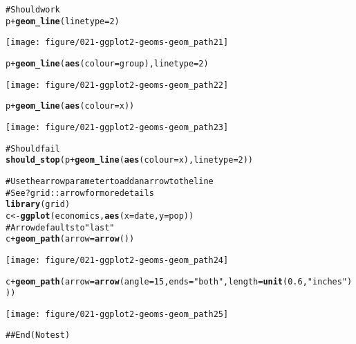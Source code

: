 \documentclass[a4paper,titlepage]{tufte-handout}\usepackage{graphicx, color}
\makeatletter
\def\maxwidth{ %
  \ifdim\Gin@nat@width>\linewidth
    \linewidth
  \else
    \Gin@nat@width
  \fi
}
\newcommand{\hlfunctioncall}[1]{\textcolor[rgb]{0.501960784313725,0,0.329411764705882}{\textbf{#1}}}%
\newcommand{\hlstring}[1]{\textcolor[rgb]{0.6,0.6,1}{#1}}%
\newcommand{\hlcomment}[1]{\textcolor[rgb]{0.180392156862745,0.6,0.341176470588235}{#1}}%
\newenvironment{kframe}{%
 \def\at@end@of@kframe{}%
 \ifinner\ifhmode%
  \def\at@end@of@kframe{\end{minipage}}%
  \begin{minipage}{\columnwidth}%
 \fi\fi%
 \def\FrameCommand##1{\hskip\@totalleftmargin \hskip-\fboxsep
 \colorbox{shadecolor}{##1}\hskip-\fboxsep
     \hskip-\linewidth \hskip-\@totalleftmargin \hskip\columnwidth}%
 \MakeFramed {\advance\hsize-\width
   \@totalleftmargin\z@ \linewidth\hsize
   \@setminipage}}%
 {\par\unskip\endMakeFramed%
 \at@end@of@kframe}
\newenvironment{knitrout}{}{} %
\makeatother
\begin{document}
\begin{knitrout}
\begin{kframe}
\begin{alltt}
\hlcomment{# Should work}
p + \hlfunctioncall{geom_line}(linetype = 2)
\end{alltt}
\end{kframe}
\texttt{[image: figure/021-ggplot2-geoms-geom\_path21]} 
\begin{kframe}\begin{alltt}
p + \hlfunctioncall{geom_line}(\hlfunctioncall{aes}(colour = group), linetype = 2)
\end{alltt}
\end{kframe}
\texttt{[image: figure/021-ggplot2-geoms-geom\_path22]} 
\begin{kframe}\begin{alltt}
p + \hlfunctioncall{geom_line}(\hlfunctioncall{aes}(colour = x))
\end{alltt}
\end{kframe}
\texttt{[image: figure/021-ggplot2-geoms-geom\_path23]} 
\begin{kframe}\begin{alltt}

\hlcomment{# Should fail}
\hlfunctioncall{should_stop}(p + \hlfunctioncall{geom_line}(\hlfunctioncall{aes}(colour = x), linetype=2))

\hlcomment{# Use the arrow parameter to add an arrow to the line}
\hlcomment{# See ?grid::arrow for more details}
\hlfunctioncall{library}(grid)
c <- \hlfunctioncall{ggplot}(economics, \hlfunctioncall{aes}(x = date, y = pop))
\hlcomment{# Arrow defaults to "last"}
c + \hlfunctioncall{geom_path}(arrow = \hlfunctioncall{arrow}())
\end{alltt}
\end{kframe}
\texttt{[image: figure/021-ggplot2-geoms-geom\_path24]} 
\begin{kframe}\begin{alltt}
c + \hlfunctioncall{geom_path}(arrow = \hlfunctioncall{arrow}(angle = 15, ends = \hlstring{"both"}, length = \hlfunctioncall{unit}(0.6, \hlstring{"inches"})))
\end{alltt}
\end{kframe}
\texttt{[image: figure/021-ggplot2-geoms-geom\_path25]} 
\begin{kframe}\begin{alltt}
\hlcomment{## End(No test)}


\end{alltt}
\end{kframe}
\end{knitrout}
\end{document}
